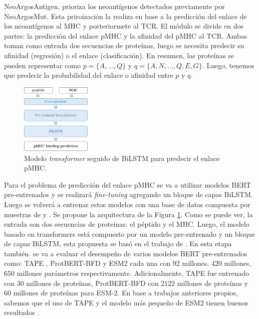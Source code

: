 \documentclass[a4paper,11pt]{article}
\begin{document}
NeoArgosAntigen, prioriza los neoantígenos detectados previamente por NeoArgosMut. Esta priroización la realiza en base a la predicción del enlace de los neoantígenos al MHC y posteriormete al TCR. El módulo se divide en dos partes: la predicción del enlace pMHC y la afinidad del pMHC al TCR. Ambas toman como entrada dos secuencias de proteínas, luego se necesita predecir su afinidad (regresión) o el enlace (clasificación). En resumen, las proteínas se pueden representar como $p = \{ A, ... , Q \}$ y $q = \{ A, N, ... ,Q, E, G \}$. Luego, tenemos que  predecir la probabilidad del enlace o afinidad entre $p$ y $q$. 

\begin{figure} %
    \centering
    \includegraphics[width=0.30\textwidth]{../img/pipeline/proposal_pmhc}
    \caption{Modelo  \textit{transformer} seguido de BiLSTM para predecir el enlace pMHC.}
	\label{fig:proposal}
\end{figure}

Para el problema de predicción del enlace pMHC se va a utilizar modelos BERT pre-entrenados y se realizará \textit{fine-tuning} agregando un bloque de capas BiLSTM. Luego se volverá a entrenar estos modelos con una base de datos compuesta por muestras de \cite{zhang2022hlab} y \cite{gfeller2023improved}. Se propone la arquitectura de la Figura \ref{fig:proposal}. Como se puede ver, la entrada son dos secuencias de proteínas: el péptido y el MHC. Luego, el modelo basado en transformers está compuesto por un modelo pre-entrenado y un bloque de capas BiLSTM, esta propuesta se basó en el trabajo de \cite{zhang2022hlab}. En esta etapa también. se va a evaluar el desempeño de varios modelos BERT pre-entrenados como: TAPE \citep{rao2019evaluating}, ProtBERT-BFD \citep{elnaggar2021prottrans} y ESM2 \citep{lin2023evolutionary} cada una con 92 millones, 420 millones, 650 millones parámetros respectivamente. Adicionalmente, TAPE fue entrenado con 30 millones de proteínas, ProtBERT-BFD con 2122 millones de proteínas y 60 millones de proteínas para ESM-2. En base a trabajos anteriores propios, sabemos que el uso de TAPE y el modelo más pequeño de ESM2 tienen buenos resultados \citep{arceda2023neoantigen}.
\end{document}
